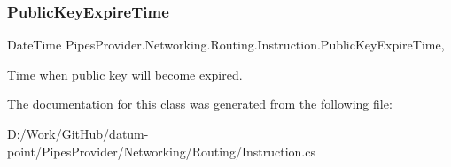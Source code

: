 \subsubsection{\texorpdfstring{Public\+Key\+Expire\+Time}{PublicKeyExpireTime}}
{\footnotesize\ttfamily Date\+Time Pipes\+Provider.\+Networking.\+Routing.\+Instruction.\+Public\+Key\+Expire\+Time\hspace{0.3cm}{\ttfamily [get]}, {}}



Time when public key will become expired. 



The documentation for this class was generated from the following file\+:\begin{DoxyCompactItemize}
\item 
D\+:/\+Work/\+Git\+Hub/datum-\/point/\+Pipes\+Provider/\+Networking/\+Routing/Instruction.\+cs\end{DoxyCompactItemize}
